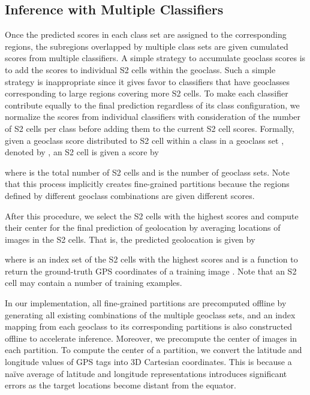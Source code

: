 \documentclass[runningheads]{llncs}
\begin{document}
\subsection{Inference with Multiple Classifiers}
\label{sub:inference}
Once the predicted scores in each class set are assigned to the corresponding regions, the subregions overlapped by multiple class sets are given cumulated scores from multiple classifiers.
A simple strategy to accumulate geoclass scores is to add the scores to individual S2 cells within the geoclass.
Such a simple strategy is inappropriate since it gives favor to classifiers that have geoclasses corresponding to large regions covering more S2 cells.
To make each classifier contribute equally to the final prediction regardless of its class configuration, we normalize the scores from individual classifiers with consideration of the number of S2 cells per class before adding them to the current S2 cell scores.
Formally, given a geoclass score distributed to S2 cell  within a class in a geoclass set , denoted by , an S2 cell is given a score  by

where  is the total number of S2 cells and  is the number of geoclass sets.
Note that this process implicitly creates fine-grained partitions because the regions defined by different geoclass combinations are given different scores.

After this procedure, we select the S2 cells with the highest scores and compute their center for the final prediction of geolocation by averaging locations of images in the S2 cells. 
That is, the predicted geolocation  is given by
\iffalse

\fi

where  is an index set of the S2 cells with the highest scores and  is a function to return the ground-truth GPS coordinates of a training image .
Note that an S2 cell  may contain a number of training examples.

In our implementation, all fine-grained partitions are precomputed offline by generating all existing combinations of the multiple geoclass sets, and an index mapping from each geoclass to its corresponding partitions is also constructed offline to accelerate inference.
Moreover, we precompute the center of images in each partition.
To compute the center of a partition, we convert the latitude and longitude values of GPS tags into 3D Cartesian coordinates.
This is because a na\"ive average of latitude and longitude representations introduces significant errors as the target locations become distant from the equator.
\end{document}
